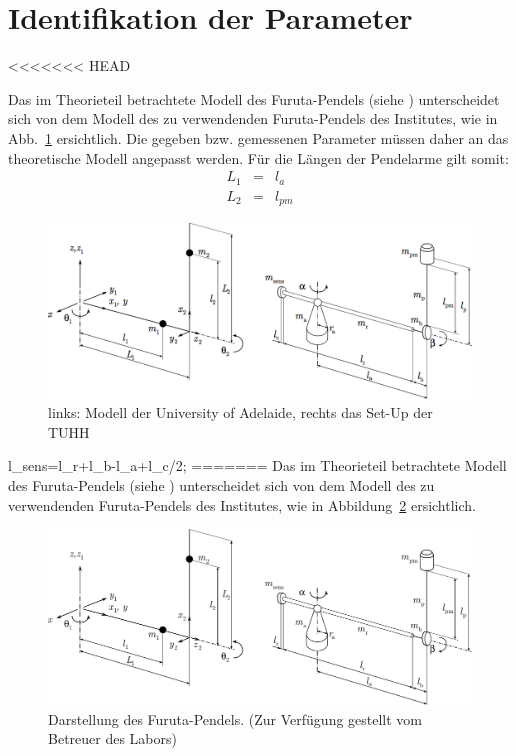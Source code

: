 \section{Identifikation der Parameter}
<<<<<<< HEAD

Das im Theorieteil betrachtete Modell des Furuta-Pendels (siehe \citep{Cazzolato.2011}) unterscheidet sich von dem Modell des zu verwendenden Furuta-Pendels des Institutes, wie in Abb.~\ref{fig.parameter} 
ersichtlich.
Die gegeben bzw. gemessenen Parameter müssen daher an das theoretische Modell angepasst werden. Für die Längen der Pendelarme gilt somit:
\begin{eqnarray}
L_1 &=& l_a \nonumber \\
L_2 &=& l_{pm}

\end{eqnarray}

\begin{figure}[htbp]
	\centering	
	\includegraphics[width=1\textwidth]{Grafiken/ParameterFuruta.png}
	\caption{links: Modell der University of Adelaide, rechts das Set-Up der TUHH}
	\label{fig.parameter}
\end{figure}
l_sens=l_r+l_b-l_a+l_c/2;
=======
\label{sec.Parameter}
Das im Theorieteil betrachtete Modell des Furuta-Pendels (siehe \cite{Cazzolato.2011}) unterscheidet sich von dem Modell des zu verwendenden Furuta-Pendels des Institutes, wie in Abbildung~\ref{fig.FurutaPlant} ersichtlich.

\begin{figure}[htbp]
	\centering
	\includegraphics[width=1.\textwidth]{Grafiken/adelaideimagenew}
	\caption{Darstellung des Furuta-Pendels. (Zur Verfügung gestellt vom Betreuer des Labors) }
	\label{fig.FurutaPlant}
\end{figure}

